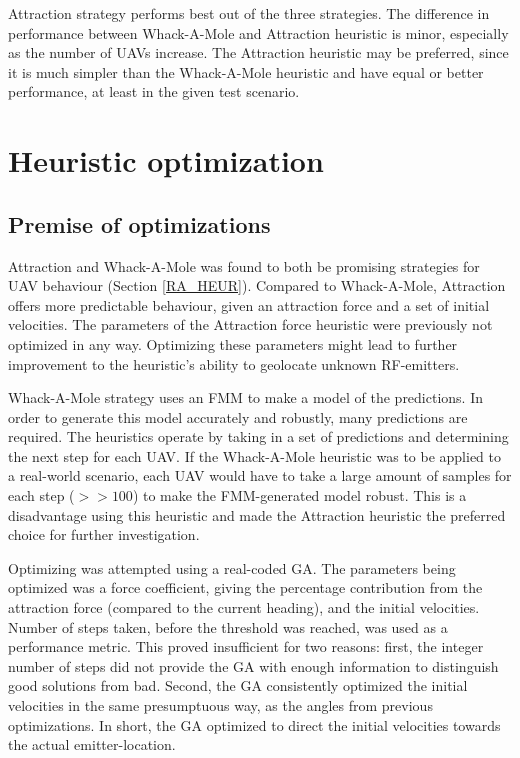 \documentclass[10pt,a4paper]{book}
\begin{document}
Attraction strategy performs best out of the three strategies. The difference in performance between Whack-A-Mole and Attraction heuristic is minor, especially as the number of \glspl{UAV} increase. The Attraction heuristic may be preferred, since it is much simpler than the Whack-A-Mole heuristic and have equal or better performance, at least in the given test scenario.



\newpage

\section{Heuristic optimization}

\subsection{Premise of optimizations}

Attraction and Whack-A-Mole was found to both be promising strategies for \gls{UAV} behaviour (Section \ref{RA_HEUR}). Compared to Whack-A-Mole, Attraction offers more predictable behaviour, given an attraction force and a set of initial velocities. The parameters of the Attraction force heuristic were previously not optimized in any way. Optimizing these parameters might lead to further improvement to the heuristic's ability to geolocate unknown \gls{RF}-emitters.

Whack-A-Mole strategy uses an \gls{FMM} to make a model of the predictions. In order to generate this model accurately and robustly, many predictions are required. The heuristics operate by taking in a set of predictions and determining the next step for each \gls{UAV}. If the Whack-A-Mole heuristic was to be applied to a real-world scenario, each \gls{UAV} would have to take a large amount of samples for each step ($>> 100$) to make the \gls{FMM}-generated model robust. This is a disadvantage using this heuristic and made the Attraction heuristic the preferred choice for further investigation.

Optimizing was attempted using a real-coded \gls{GA}. The parameters being optimized was a force coefficient, giving the percentage contribution from the attraction force (compared to the current heading), and the initial velocities. Number of steps taken, before the threshold was reached, was used as a performance metric. This proved insufficient for two reasons: first, the integer number of steps did not provide the \gls{GA} with enough information to distinguish good solutions from bad. Second, the \gls{GA} consistently optimized the initial velocities in the same presumptuous way, as the angles from previous optimizations. In short, the \gls{GA} optimized to direct the initial velocities towards the actual emitter-location.
\end{document}
